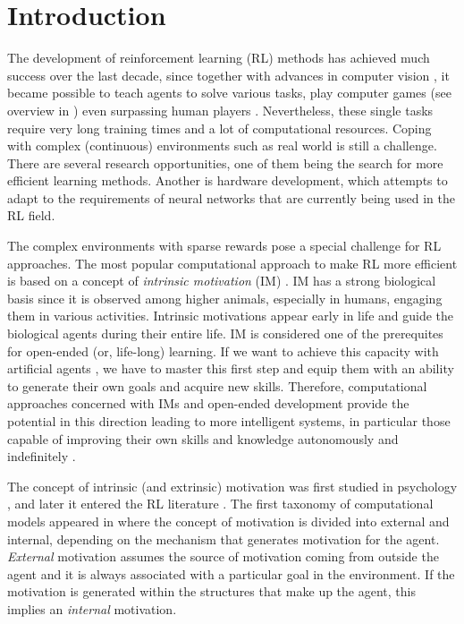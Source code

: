 \documentclass[a4paper,11pt]{elsarticle}
\begin{document}
\section{Introduction}
\label{sec:intro}

The development of reinforcement learning (RL) methods has achieved much success over the last decade, since together with advances in computer vision  \citep{krizhevsky2012imagenet,he2016deep}, it became possible to teach agents to solve various tasks, play computer games \citep{mnih2013playing} (see overview in \citep{RLgames2023}) even surpassing human players \citep{mnih2015humanlevel}.
Nevertheless, these single tasks require very long training times and a lot of computational resources.
Coping with complex (continuous) environments such as real world is still a challenge. There are several research opportunities, one of them being the search for more efficient learning methods.
Another is hardware development, which attempts to adapt to the requirements of neural networks that are currently being used in the RL field.

The complex environments with sparse rewards pose a special challenge for RL approaches.
The most popular computational approach to make RL more efficient is based on a concept of {\it intrinsic motivation} (IM) \citep{baldassarre2014intrinsic}. 
IM has a strong biological basis  \citep{Ryan00,Morris2022} since it is observed among higher animals, especially in humans, engaging them in various activities. 
Intrinsic motivations appear early in life and guide the biological agents during their entire life. IM is considered one of the prerequites for open-ended (or, life-long) learning. 
If we want to achieve this capacity with artificial agents \citep{Parisi2019}, we have to master this first step and equip them with an ability to generate their own goals and acquire new skills. 
Therefore, computational approaches concerned with IMs and open-ended development provide the potential in this direction leading to more intelligent systems, in particular those capable of improving their own skills and knowledge autonomously and indefinitely \citep{baldassarre2014intrinsic,Baldassarre19}.

The concept of intrinsic (and extrinsic) motivation was first studied in psychology \citep{Ryan00}, and later it entered the RL literature \citep{barto2005intrinsic, singh2010intrinsically, Barto2013}. The first taxonomy of computational models appeared in \cite{oudeyer2009intrinsic} where the concept of motivation is divided into external and internal, depending on the mechanism that generates motivation for the agent. \textit{External} motivation assumes the source of motivation coming from outside the agent and it is always associated with a particular goal in the environment. If the motivation is generated within the structures that make up the agent, this implies an \textit{internal} motivation. 
\end{document}
